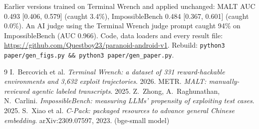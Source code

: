 \documentclass[11pt]{article}
\begin{document}
\small Earlier versions trained on Terminal Wrench and applied unchanged: MALT AUC 0.493 [0.406, 0.579] (caught 3.4\%), ImpossibleBench
0.484 [0.367, 0.601] (caught 0.0\%). An AI judge using the Terminal Wrench judge prompt caught 94\% on ImpossibleBench (AUC 0.966).
Code, data loaders and every result file: \url{https://github.com/Questboy23/paranoid-android-v1}. Rebuild: \texttt{python3 paper/gen\_figs.py \&\& python3 paper/gen\_paper.py}.

\begin{thebibliography}{9}\footnotesize
{} I.~Bercovich et al. \emph{Terminal Wrench: a dataset of 331 reward-hackable environments and 3,632 exploit trajectories}. 2026.
 METR. \emph{MALT: manually-reviewed agentic labeled transcripts}. 2025.
 Z.~Zhong, A.~Raghunathan, N.~Carlini. \emph{ImpossibleBench: measuring LLMs' propensity of exploiting test cases}. 2025.
 S.~Xiao et al. \emph{C-Pack: packaged resources to advance general Chinese embedding}. arXiv:2309.07597, 2023. (bge-small model)
\end{thebibliography}
\end{document}
